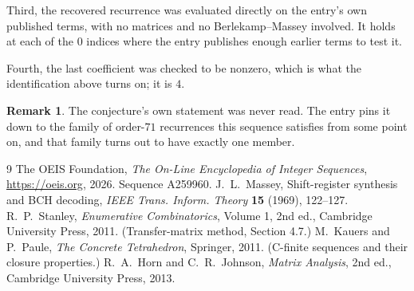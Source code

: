 \documentclass[11pt,a4paper]{article}
\theoremstyle{plain}
\theoremstyle{definition}
\newtheorem{remark}[theorem]{Remark}
\begin{document}
Third, the recovered recurrence was evaluated directly on the entry's own published terms, with
no matrices and no Berlekamp--Massey involved. It holds at each of the $0$ indices where
the entry publishes enough earlier terms to test it.

Fourth, the last coefficient was checked to be nonzero, which is what the identification above
turns on; it is $4$.

\begin{remark}
The conjecture's own statement was never read. The entry pins it down to the family of
order-$71$ recurrences this sequence satisfies from some point on, and that family turns
out to have exactly one member.
\end{remark}

\begin{thebibliography}{9}
 The OEIS Foundation, \emph{The On-Line Encyclopedia of Integer
Sequences}, \url{https://oeis.org}, 2026. Sequence A259960.
 J.~L.~Massey, Shift-register synthesis and BCH decoding, \emph{IEEE
Trans. Inform. Theory} \textbf{15} (1969), 122--127.
 R.~P.~Stanley, \emph{Enumerative Combinatorics}, Volume 1, 2nd ed.,
Cambridge University Press, 2011. (Transfer-matrix method, Section 4.7.)
 M.~Kauers and P.~Paule, \emph{The Concrete Tetrahedron}, Springer, 2011.
(C-finite sequences and their closure properties.)
 R.~A.~Horn and C.~R.~Johnson, \emph{Matrix Analysis}, 2nd ed., Cambridge
University Press, 2013.
\end{thebibliography}
\end{document}
